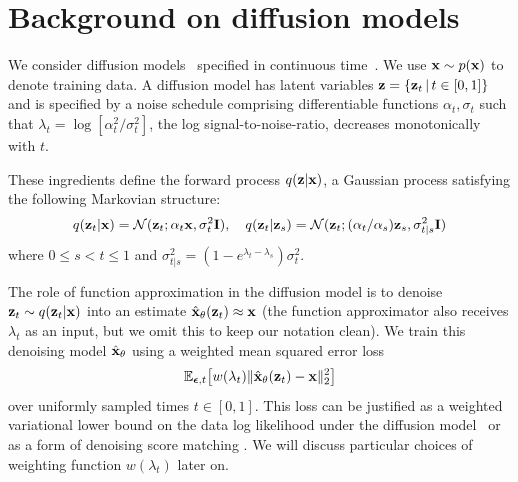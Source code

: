\documentclass[hidelinks]{article} %
\begin{document}
\section{Background on diffusion models}
\label{sec:background}
We consider diffusion models~\citep{sohl2015deep,song2019generative,ho2020denoising} specified in continuous time~\citep{tzen2019neural,song2020score,chen2020wavegrad,kingma2021variational}. We use $\mathbf{x} \sim p(\mathbf{x})$ to denote training data. A diffusion model has latent variables $\mathbf{z} = \{\mathbf{z}_t \,|\, t \in [0,1]\}$ and is specified by a noise schedule comprising differentiable functions $\alpha_t, \sigma_t$ such that $\lambda_t = \log[\alpha_t^2/\sigma_t^2]$, the log signal-to-noise-ratio, decreases monotonically with $t$.

These ingredients define the forward process $q(\mathbf{z}|\mathbf{x})$, a Gaussian process satisfying the following Markovian structure:
\begin{align}
    q(\mathbf{z}_t|\mathbf{x}) = \mathcal{N}(\mathbf{z}_t; \alpha_t \mathbf{x}, \sigma_t^2 \mathbf{I}), \quad
    q(\mathbf{z}_t | \mathbf{z}_s) = \mathcal{N}(\mathbf{z}_t; (\alpha_t/\alpha_s)\mathbf{z}_s, \sigma_{t|s}^2\mathbf{I})
\end{align}
where $0 \leq s < t \leq 1$ and $\sigma^2_{t|s} = (1-e^{\lambda_t-\lambda_s})\sigma_t^2$. 

The role of function approximation in the diffusion model is to denoise $\mathbf{z}_t\sim q(\mathbf{z}_t|\mathbf{x})$ into an estimate $\hat{\mathbf{x}}_\theta(\mathbf{z}_t) \approx \mathbf{x}$ (the function approximator also receives $\lambda_t$ as an input, but we omit this to keep our notation clean). We train this denoising model $\hat{\mathbf{x}}_\theta$ using a weighted mean squared error loss
\begin{align}
    \mathbb{E}_{{\boldsymbol{\epsilon}},t}\!\left[w(\lambda_t) \|\hat{\mathbf{x}}_\theta(\mathbf{z}_t) - \mathbf{x} \|^2_2\right]
\end{align}
over uniformly sampled times $t \in [0,1]$. This loss can be justified as a weighted variational lower bound on the data log likelihood under the diffusion model~\citep{kingma2021variational} or as a form of denoising score matching \citep{vincent2011connection, song2019generative}. We will discuss particular choices of weighting function $w(\lambda_t)$ later on.
\end{document}
